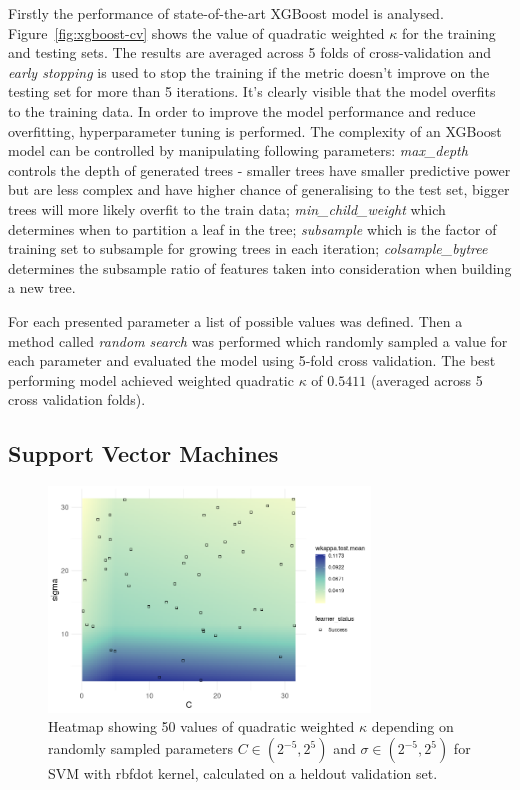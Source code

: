 \documentclass[fleqn,10pt]{SelfArx} %
\begin{document}
Firstly the performance of state-of-the-art XGBoost model is analysed.
Figure~\ref{fig:xgboost-cv} shows the value of quadratic weighted $\kappa$ for the training and testing sets.
The results are averaged across 5 folds of cross-validation and \textit{early stopping} is used to stop the training if the metric doesn't improve on the testing set for more than 5 iterations.
It's clearly visible that the model overfits to the training data.
In order to improve the model performance and reduce overfitting, hyperparameter tuning is performed.
The complexity of an XGBoost model can be controlled by manipulating following parameters: \textit{max\_depth} controls the depth of generated trees - smaller trees have smaller predictive power but are less complex and have higher chance of generalising to the test set, bigger trees will more likely overfit to the train data; \textit{min\_child\_weight} which determines when to partition a leaf in the tree; \textit{subsample} which is the factor of training set to subsample for growing trees in each iteration; \textit{colsample\_bytree} determines the subsample ratio of features taken into consideration when building a new tree.

For each presented parameter a list of possible values was defined.
Then a method called \textit{random search} was performed which randomly sampled a value for each parameter and evaluated the model using 5-fold cross validation.
The best performing model achieved weighted quadratic $\kappa$ of $0.5411$ (averaged across 5 cross validation folds).

\subsection{Support Vector Machines}

\begin{figure}
    \centering
    \includegraphics[width=\linewidth,height=6cm]{images/svm-optimisation.png}
    \caption{Heatmap showing 50 values of quadratic weighted $\kappa$ depending on randomly sampled parameters $C \in (2^{-5}, 2^5)$ and $\sigma \in (2^{-5}, 2^5)$ for SVM with rbfdot kernel, calculated on a heldout validation set.}
    \label{fig:svm-optimisation-1}
\end{figure}
\end{document}
